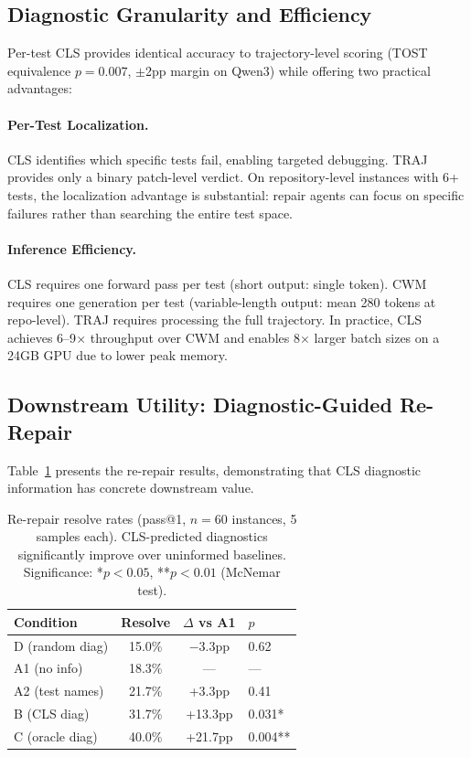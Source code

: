 \documentclass[11pt,a4paper]{article}
\begin{document}
\subsection{Diagnostic Granularity and Efficiency}

Per-test CLS provides identical accuracy to trajectory-level scoring (TOST equivalence $p=0.007$, $\pm$2pp margin on Qwen3) while offering two practical advantages:

\paragraph{Per-Test Localization.} CLS identifies which specific tests fail, enabling targeted debugging. TRAJ provides only a binary patch-level verdict. On repository-level instances with 6+ tests, the localization advantage is substantial: repair agents can focus on specific failures rather than searching the entire test space.

\paragraph{Inference Efficiency.} CLS requires one forward pass per test (short output: single token). CWM requires one generation per test (variable-length output: mean 280 tokens at repo-level). TRAJ requires processing the full trajectory. In practice, CLS achieves 6--9$\times$ throughput over CWM and enables 8$\times$ larger batch sizes on a 24GB GPU due to lower peak memory.

\subsection{Downstream Utility: Diagnostic-Guided Re-Repair}

Table~\ref{tab:rerepair} presents the re-repair results, demonstrating that CLS diagnostic information has concrete downstream value.

\begin{table}[t]
\centering
\small
\begin{tabular}{lccl}
\toprule
\textbf{Condition} & \textbf{Resolve} & \textbf{$\Delta$ vs A1} & \textbf{$p$} \\
\midrule
D (random diag) & 15.0\% & $-$3.3pp & 0.62 \\
A1 (no info) & 18.3\% & --- & --- \\
A2 (test names) & 21.7\% & +3.3pp & 0.41 \\
B (CLS diag) & 31.7\% & +13.3pp & 0.031* \\
C (oracle diag) & 40.0\% & +21.7pp & 0.004** \\
\bottomrule
\end{tabular}
\caption{Re-repair resolve rates (pass@1, $n=60$ instances, 5 samples each). CLS-predicted diagnostics significantly improve over uninformed baselines. Significance: *$p<0.05$, **$p<0.01$ (McNemar test).}
\label{tab:rerepair}
\end{table}
\end{document}
